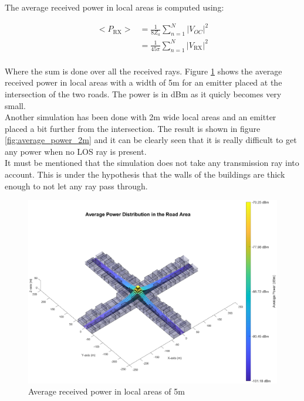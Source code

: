 \documentclass[10pt,a4paper]{ULBreport}
\begin{document}
The average received power in local areas is computed using:

\begin{align*}
    <P_{\text{RX}}> &= \frac{1}{8 Z_a} \sum_{n=1}^{N} \left| V_{OC} \right|^2\\
    &= \frac{1}{45\pi} \sum_{n=1}^{N} \left| V_{\text{RX}} \right|^2\\
\end{align*}

Where the sum is done over all the received rays. Figure \ref{fig:average_power} shows the average received power in local areas with a width of 5m for an emitter placed at the intersection of the two roads. The power is in dBm as it quicly becomes very small. \\
Another simulation has been done with 2m wide local areas and an emitter placed a bit further from the intersection. The result is shown in figure \ref{fig:average_power_2m} and it can be clearly seen that it is really difficult to get any power when no LOS ray is present. \\
It must be mentioned that the simulation does not take any transmission ray into account. This is under the hypothesis that the walls of the buildings are thick enough to not let any ray pass through.

\begin{figure}[H]
    \centering
    \includegraphics[width=1\textwidth]{3_5.eps}
    \caption{Average received power in local areas of 5m}
    \label{fig:average_power}
\end{figure}
\end{document}
